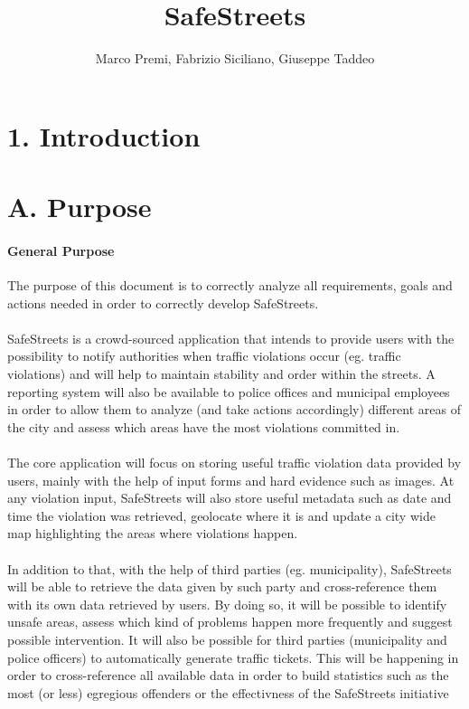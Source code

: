 \documentclass{article}
\title{SafeStreets}
\author{Marco Premi, Fabrizio Siciliano, Giuseppe Taddeo}
\begin{document}
\maketitle

\newpage
\section*{1. Introduction}
    \section*{A. Purpose}
    \paragraph{General Purpose}
    The purpose of this document is to correctly analyze all requirements, goals 
    and actions needed in order to correctly develop SafeStreets.\\
    \\
    SafeStreets is a crowd-sourced application that intends to provide users with the possibility to notify authorities when
    traffic violations occur (eg. traffic violations) and will help to maintain stability and order within the streets. A reporting
    system will also be available to police offices and municipal employees in order to allow them to analyze (and take actions accordingly)
    different areas of the city and assess which areas have the most violations committed in.\\
    \\
    The core application will focus on storing useful traffic violation data provided by users, mainly with the help of input forms and
    hard evidence such as images. At any violation input, SafeStreets will also store useful metadata such as date and time the violation 
    was retrieved, geolocate where it is and update a city wide map highlighting the areas where violations happen.\\
    \\
    In addition to that, with the help of third parties (eg. municipality), SafeStreets will be able to retrieve the data given by such party
    and cross-reference them with its own data retrieved by users. By doing so, it will be possible to identify unsafe areas, assess which kind 
    of problems happen more frequently and suggest possible intervention. It will also be possible for third parties (municipality and police officers)
    to automatically generate traffic tickets. This will be happening in order to cross-reference all available data in order to build statistics such 
    as the most (or less) egregious offenders or the effectivness of the SafeStreets initiative
\end{document}
